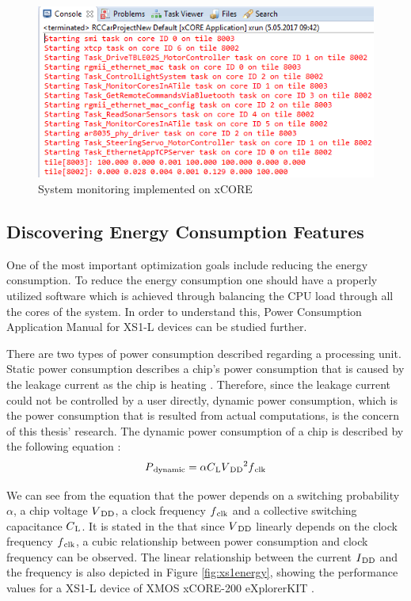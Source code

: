 \begin{figure}[!ht]
	\centering
	\captionsetup{justification=centering}
	\includegraphics[width=\textwidth]{content/images/finalmonitoring.png}
	\caption{System monitoring implemented on xCORE}
	\label{fig:finalmonitoring}
\end{figure}

\subsection{Discovering Energy Consumption Features}
One of the most important optimization goals include reducing the energy consumption. To reduce the energy consumption one should have a properly utilized software which is achieved through balancing the CPU load through all the cores of the system. In order to understand this, Power Consumption Application Manual for XS1-L devices \cite{xs1energymanual} can be studied further. 

There are two types of power consumption described regarding a processing unit. Static power consumption describes a chip's power consumption that is caused by the leakage current as the chip is heating \cite{springerparallel}. Therefore, since the leakage current could not be controlled by a user directly, dynamic power consumption, which is the power consumption that is resulted from actual computations, is the concern of this thesis' research. The dynamic power consumption of a chip is described by the following equation \cite{dvfspaper}: 
\begin{equation} \label{dyneq}
P\textsubscript{dynamic} = {\alpha} {C\textsubscript{L}} {V\textsubscript{DD}\textsuperscript{2}} {f\textsubscript{clk}}
\end{equation}

We can see from the equation that the power depends on a switching probability ${\alpha}$, a chip voltage ${V\textsubscript{DD}}$, a clock frequency ${f\textsubscript{clk}}$ and a collective switching capacitance ${C\textsubscript{L}}$. It is stated in the \cite{springerparallel} that since ${V\textsubscript{DD}}$ linearly depends on the clock frequency ${f\textsubscript{clk}}$, a cubic relationship between power consumption and clock frequency can be observed. The linear relationship between the current ${I\textsubscript{DD}}$ and the frequency is also depicted in Figure \ref{fig:xs1energy}, showing the performance values for a XS1-L device of XMOS xCORE-200 eXplorerKIT \cite{xs1energymanual}.

